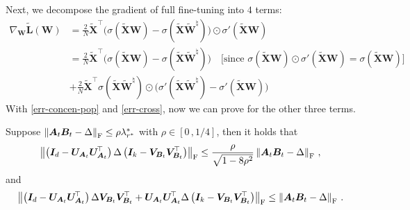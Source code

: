 \if 
Next, we decompose the gradient of full fine-tuning into $4$ terms:
\begin{align*}
    \nabla_{\bm W}\widetilde{\bm L}\left(\bm W\right) & = \frac{2}{N}\widetilde{\bm X}^{\!\top}\bigg(\sigma\left(\widetilde{\bm X}\bm W\right) - \sigma\left(\widetilde{\bm X}\widetilde{\bm W}^\natural\right)\bigg) \odot \sigma'\left(\widetilde{\bm X}\bm W\right)\\
    & = \frac{2}{N}\widetilde{\bm X}^{\!\top}\bigg(\sigma\left(\widetilde{\bm X}\bm W\right) - \sigma\left(\widetilde{\bm X}\widetilde{\bm W}^\natural\right)\bigg)\quad \bigg[\text{since }\sigma\left(\widetilde{\bm X}\bm W\right)\odot \sigma'\left(\widetilde{\bm X}\bm W\right)=\sigma\left(\widetilde{\bm X}\bm W\right)\bigg]\\
    & + \frac{2}{N}\widetilde{\bm X}^{\!\top}\sigma\left(\widetilde{\bm X}\widetilde{\bm W}^\natural\right) \odot \bigg(\sigma'\left(\widetilde{\bm X}\widetilde{\bm W}^\natural\right)-\sigma'\left(\widetilde{\bm X}\bm W\right)\bigg)
\end{align*}
\fi
With \cref{err-concen-pop} and \cref{err-cross}, now we can prove for the other three terms.
\begin{lemma}
\label{basis-alignment}
Suppose $\left\|\bm A_t \bm B_t - \Delta\right\|_{\rm F}\leq \rho \lambda^*_{r^*}$ with $\rho \in [0\,,1/4]$, then it holds that
    \begin{align*}
        \left\|\left(\bm I_d - \bm U_{\bm A_t} \bm U_{\bm A_t}^{\!\top}\right)\Delta\left(\bm I_k - \bm V_{\bm B_t} \bm V_{\bm B_t}^{\!\top}\right)\right\|_{\rm F} \leq \frac{\rho}{\sqrt{1-8\rho^2}}\left\|\bm A_t \bm B_t - \Delta\right\|_{\rm F}\,,
    \end{align*}
    and
    \begin{align*}
        \left\|\left(\bm I_d - \bm U_{\bm A_t} \bm U_{\bm A_t}^{\!\top}\right)\Delta\bm V_{\bm B_t} \bm V_{\bm B_t}^{\!\top}+\bm U_{\bm A_t} \bm U_{\bm A_t}^{\!\top}\Delta\left(\bm I_k - \bm V_{\bm B_t} \bm V_{\bm B_t}^{\!\top}\right)\right\|_{\rm F}\leq \left\|\bm A_t \bm B_t - \Delta\right\|_{\rm F}\,.
    \end{align*}
\end{lemma}

